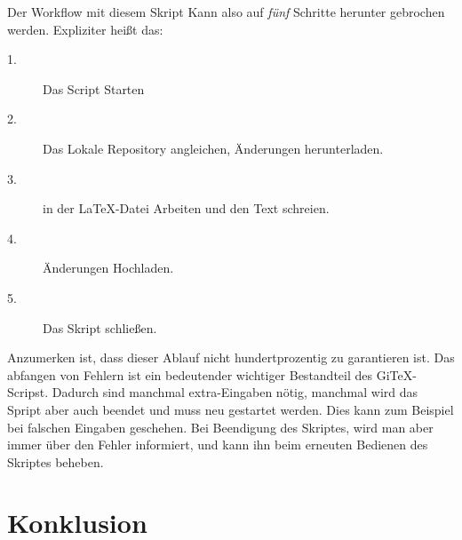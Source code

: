 \documentclass[12pt,a4paper]{scrartcl}
\begin{document}
Der Workflow mit diesem Skript Kann also auf \emph{fünf} Schritte herunter gebrochen werden. Expliziter heißt das:
\begin{description}
\item[1.] Das Script Starten
\item[2.] Das Lokale Repository angleichen, Änderungen herunterladen.
\item[3.] in der \LaTeX -Datei Arbeiten und den Text schreien.
\item[4.] Änderungen Hochladen.
\item[5.] Das Skript schließen.
\end{description}

Anzumerken ist, dass dieser Ablauf nicht hundertprozentig zu garantieren ist. Das abfangen von Fehlern ist ein bedeutender wichtiger Bestandteil des GiTeX-Scripst. Dadurch sind manchmal extra-Eingaben nötig, manchmal wird das Spript aber auch beendet und muss neu gestartet werden. Dies kann zum Beispiel bei falschen Eingaben geschehen. Bei Beendigung des Skriptes, wird man aber immer über den Fehler informiert, und kann ihn beim erneuten Bedienen des Skriptes beheben.

\section{Konklusion}
\end{document}
